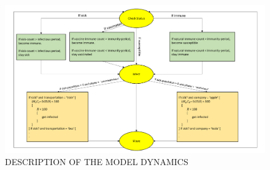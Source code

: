 \documentclass[smallextended]{svjour3}       %
\begin{document}


\begin{figure}
	\centering
	\includegraphics[width=\linewidth]{figures/modelDynamics.png}
	\caption{DESCRIPTION OF THE MODEL DYNAMICS\label{fig:modeldyn}}
\end{figure}
\end{document}
